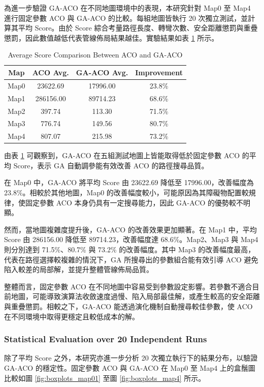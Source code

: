 \documentclass[conference]{IEEEtran}
\begin{document}
為進一步驗證 GA-ACO 在不同地圖環境中的表現，本研究針對 Map0 至 Map4 進行固定參數 ACO 與 GA-ACO 的比較。每組地圖皆執行 20 次獨立測試，並計算其平均 Score。由於 Score 綜合考量路徑長度、轉彎次數、安全距離懲罰與重疊懲罰，因此數值越低代表管線佈局結果越佳。實驗結果如表 \ref{tab:aco_gaaco_comparison} 所示。

\begin{table}[htbp]
\caption{Average Score Comparison Between ACO and GA-ACO}
\label{tab:aco_gaaco_comparison}
\centering
\begin{tabular}{c c c c}
\hline
Map & ACO Avg. & GA-ACO Avg. & Improvement \\
\hline
Map0 & 23622.69 & 17996.00 & 23.8\% \\
Map1 & 286156.00 & 89714.23 & 68.6\% \\
Map2 & 397.74 & 113.30 & 71.5\% \\
Map3 & 776.74 & 149.56 & 80.7\% \\
Map4 & 807.07 & 215.98 & 73.2\% \\
\hline
\end{tabular}
\end{table}

由表 \ref{tab:aco_gaaco_comparison} 可觀察到，GA-ACO 在五組測試地圖上皆能取得低於固定參數 ACO 的平均 Score，表示 GA 自動調參能有效改善 ACO 的路徑搜尋品質。

在 Map0 中，GA-ACO 將平均 Score 由 23622.69 降低至 17996.00，改善幅度為 23.8\%。相較於其他地圖，Map0 的改善幅度較小，可能原因為其障礙物配置較規律，使固定參數 ACO 本身仍具有一定搜尋能力，因此 GA-ACO 的優勢較不明顯。

然而，當地圖複雜度提升後，GA-ACO 的改善效果更加顯著。在 Map1 中，平均 Score 由 286156.00 降低至 89714.23，改善幅度達 68.6\%。Map2、Map3 與 Map4 則分別達到 71.5\%、80.7\% 與 73.2\% 的改善幅度。其中 Map3 的改善幅度最高，代表在路徑選擇較複雜的情況下，GA 所搜尋出的參數組合能有效引導 ACO 避免陷入較差的局部解，並提升整體管線佈局品質。

整體而言，固定參數 ACO 在不同地圖中容易受到參數設定影響。若參數不適合目前地圖，可能導致演算法收斂速度過慢、陷入局部最佳解，或產生較高的安全距離與重疊懲罰。相較之下，GA-ACO 能透過演化機制自動搜尋較佳參數，使 ACO 在不同環境中取得更穩定且較低成本的解。

\subsubsection{Statistical Evaluation over 20 Independent Runs}


除了平均 Score 之外，本研究亦進一步分析 20 次獨立執行下的結果分布，以驗證 GA-ACO 的穩定性。固定參數 ACO 與 GA-ACO 在 Map0 至 Map4 上的盒鬚圖比較如圖 \ref{fig:boxplots_map01} 至圖 \ref{fig:boxplots_map4} 所示。
\end{document}
